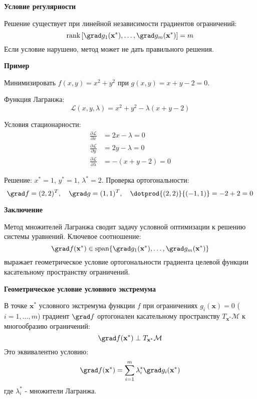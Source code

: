 \begin{center}
\large\textbf{Условие регулярности}
\end{center}
Решение существует при линейной независимости градиентов ограничений:
\[
\text{rank} \left[ \grad g_1(\mathbf{x}^*), \dots, \grad g_m(\mathbf{x}^*) \right] = m
\]
Если условие нарушено, метод может не дать правильного решения.

\begin{center}
\large\textbf{Пример}
\end{center}
Минимизировать $f(x,y) = x^2 + y^2$ при $g(x,y) = x + y - 2 = 0$.

Функция Лагранжа:
\[
\mathcal{L}(x,y,\lambda) = x^2 + y^2 - \lambda(x + y - 2)
\]

Условия стационарности:
\begin{align*}
\frac{\partial \mathcal{L}}{\partial x} &= 2x - \lambda = 0 \\
\frac{\partial \mathcal{L}}{\partial y} &= 2y - \lambda = 0 \\
\frac{\partial \mathcal{L}}{\partial \lambda} &= -(x + y - 2) = 0
\end{align*}

Решение: $x^* = 1$, $y^* = 1$, $\lambda^* = 2$. Проверка ортогональности:
\[
\grad f = (2, 2)^T, \quad \grad g = (1, 1)^T, \quad \dotprod{(2,2)}{(-1,1)} = -2 + 2 = 0
\]

\begin{center}
\large\textbf{Заключение}
\end{center}
Метод множителей Лагранжа сводит задачу условной оптимизации к решению системы уравнений. Ключевое соотношение:
\[
\grad f(\mathbf{x}^*) \in \text{span}\{ \grad g_1(\mathbf{x}^*), \dots, \grad g_m(\mathbf{x}^*) \}
\]
выражает геометрическое условие ортогональности градиента целевой функции касательному пространству ограничений.




\begin{center}
\large\textbf{Геометрическое условие условного экстремума}
\end{center}
В точке $\mathbf{x}^*$ условного экстремума функции $f$ при ограничениях $g_i(\mathbf{x}) = 0$ ($i = 1,\dots,m$) градиент $\grad f$ ортогонален касательному пространству $T_{\mathbf{x}^*}\mathcal{M}$ к многообразию ограничений:
\[
\grad f(\mathbf{x}^*) \perp T_{\mathbf{x}^*}\mathcal{M}
\]
Это эквивалентно условию:
\[
\grad f(\mathbf{x}^*) = \sum_{i=1}^m \lambda_i^* \grad g_i(\mathbf{x}^*)
\]
где $\lambda_i^*$ - множители Лагранжа.

